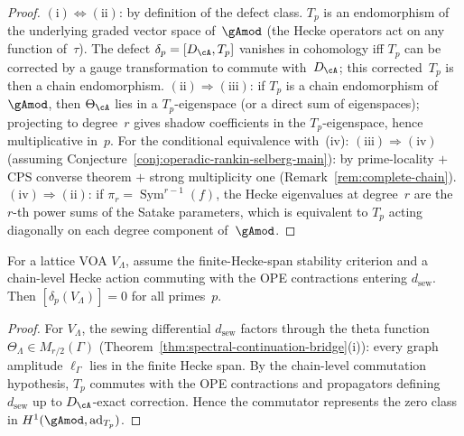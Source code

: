 \begin{proof}
$\mathrm{(i)} \Leftrightarrow \mathrm{(ii)}$: by definition
of the defect class. $T_p$ is an endomorphism of the
underlying graded vector space of~$\gAmod$ (the Hecke operators
act on any function of~$\tau$). The defect
$\delta_p = [D_\cA, T_p]$ vanishes in cohomology iff
$T_p$ can be corrected by a gauge transformation to commute
with~$D_\cA$; this corrected~$T_p$ is then a chain
endomorphism.
$\mathrm{(ii)} \Rightarrow \mathrm{(iii)}$:
if $T_p$ is a chain endomorphism of~$\gAmod$, then $\Theta_\cA$
lies in a $T_p$-eigenspace (or a direct sum of eigenspaces);
projecting to degree~$r$ gives shadow coefficients in the
$T_p$-eigenspace, hence multiplicative in~$p$.
For the conditional equivalence with~(iv):
$\mathrm{(iii)} \Rightarrow \mathrm{(iv)}$
(assuming Conjecture~\ref{conj:operadic-rankin-selberg-main}):
by prime-locality $+$ CPS converse theorem $+$ strong multiplicity one
(Remark~\ref{rem:complete-chain}).
$\mathrm{(iv)} \Rightarrow \mathrm{(ii)}$:
if $\pi_r = \operatorname{Sym}^{r-1}(f)$, the Hecke eigenvalues
at degree~$r$ are the $r$-th power sums of the Satake parameters,
which is equivalent to $T_p$ acting diagonally on each degree
component of~$\gAmod$.
\end{proof}

\begin{proposition}%
\label{prop:hecke-defect-lattice}%
%
For a lattice VOA $V_\Lambda$, assume the finite-Hecke-span stability
criterion and a chain-level Hecke action commuting with the OPE
contractions entering $d_{\mathrm{sew}}$. Then
$[\delta_p(V_\Lambda)] = 0$ for all primes~$p$.
\end{proposition}

\begin{proof}
For $V_\Lambda$, the sewing differential $d_{\mathrm{sew}}$
factors through the theta function
$\Theta_\Lambda \in M_{r/2}(\Gamma)$
(Theorem~\ref{thm:spectral-continuation-bridge}(i)):
every graph amplitude $\ell_\Gamma$ lies in the finite Hecke span.
By the chain-level commutation hypothesis, $T_p$ commutes with the
OPE contractions and propagators defining $d_{\mathrm{sew}}$ up to
$D_\cA$-exact correction. Hence the commutator represents the zero
class in $H^1(\gAmod,\mathrm{ad}_{T_p})$.
\end{proof}

